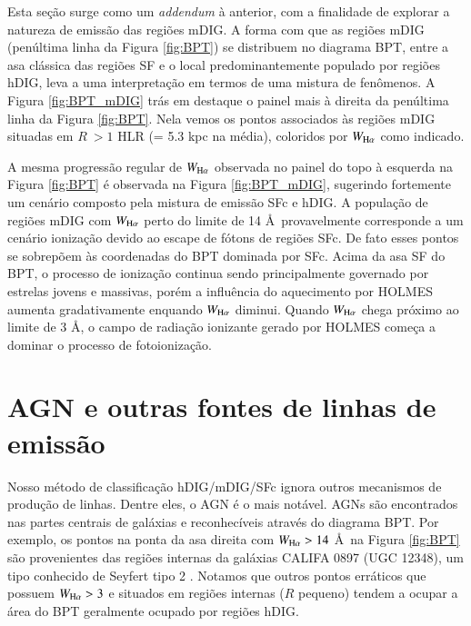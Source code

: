 Esta seção surge como um {\em addendum} à anterior, com a finalidade de explorar a natureza de emissão das regiões mDIG. A forma com que as regiões mDIG (penúltima linha da Figura \ref{fig:BPT}) se distribuem no diagrama BPT, entre a asa clássica das regiões SF e o local predominantemente populado por regiões hDIG, leva a uma interpretação em termos de uma mistura de fenômenos.
A Figura \ref{fig:BPT_mDIG} trás em destaque o painel mais à direita da penúltima linha da Figura \ref{fig:BPT}. Nela vemos os pontos associados às regiões mDIG situadas em $R\ > 1$ HLR (= 5.3 kpc na média), coloridos por $W_{\Ha}$ como indicado.

A mesma progressão regular de $W_{\Ha}$ observada no painel do topo à esquerda na Figura \ref{fig:BPT} é observada na Figura \ref{fig:BPT_mDIG}, sugerindo fortemente um cenário composto pela mistura de emissão SFc e hDIG. A população de regiões mDIG com $W_{\Ha}$ perto do limite de 14 \AA\ provavelmente corresponde a um cenário ionização devido ao escape de fótons de regiões SFc. De fato esses pontos se sobrepõem às coordenadas do BPT dominada por SFc. Acima da asa SF do BPT, o processo de ionização continua sendo principalmente governado por estrelas jovens e massivas, porém a influência do aquecimento por HOLMES aumenta gradativamente enquando $W_{\Ha}$ diminui. Quando $W_{\Ha}$ chega próximo ao limite de 3 \AA, o campo de radiação ionizante gerado por HOLMES começa a dominar o processo de fotoionização.


\section{AGN e outras fontes de linhas de emissão}
\label{sec:DIGdisc:caveats}

Nosso método de classificação hDIG/mDIG/SFc ignora outros mecanismos de produção de linhas. Dentre eles, o AGN é o mais notável. AGNs são encontrados nas partes centrais de galáxias e reconhecíveis através do diagrama BPT. Por exemplo, os pontos na ponta da asa direita com $W_{\Ha} > 14$ \AA\ na Figura \ref{fig:BPT} são provenientes das regiões internas da galáxias CALIFA 0897 (UGC 12348), um tipo conhecido de Seyfert tipo 2 \citep{Cusumano.etal.2010, Asmus.etal.2014}. Notamos que outros pontos erráticos que possuem $W_{\Ha} > 3$ e situados em regiões internas ($R$ pequeno) tendem a ocupar a área do BPT geralmente ocupado por regiões hDIG.

